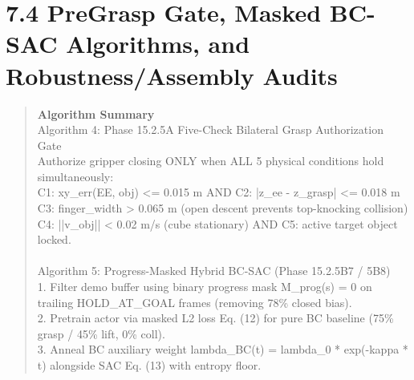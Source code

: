 \documentclass[11pt,a4paper,oneside]{book}
\begin{document}
\section{7.4 PreGrasp Gate, Masked BC-SAC Algorithms, and Robustness/Assembly Audits}
\begin{quote}\small\textbf{Algorithm Summary}\\Algorithm 4: Phase 15.2.5A Five-Check Bilateral Grasp Authorization Gate \\ Authorize gripper closing ONLY when ALL 5 physical conditions hold simultaneously: \\   C1: xy\_err(EE, obj) <= 0.015 m  AND  C2: |z\_ee - z\_grasp| <= 0.018 m \\   C3: finger\_width > 0.065 m (open descent prevents top-knocking collision) \\   C4: ||v\_obj|| < 0.02 m/s (cube stationary)  AND  C5: active target object locked. \\  \\ Algorithm 5: Progress-Masked Hybrid BC-SAC (Phase 15.2.5B7 / 5B8) \\ 1. Filter demo buffer using binary progress mask M\_prog(s) = 0 on trailing HOLD\_AT\_GOAL frames (removing 78\% closed bias). \\ 2. Pretrain actor via masked L2 loss Eq. (12) for pure BC baseline (75\% grasp / 45\% lift, 0\% coll). \\ 3. Anneal BC auxiliary weight lambda\_BC(t) = lambda\_0 * exp(-kappa * t) alongside SAC Eq. (13) with entropy floor.\end{quote}
\end{document}

